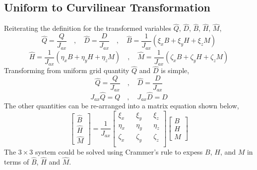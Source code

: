 \documentclass[a4paper, 12pt]{report}
\begin{document}
\begin{center}
\subsection{Uniform to Curvilinear Transformation}
\begin{comment}
Crammer's rule not complete yet
\end{comment}
Reiterating the definition for the transformed variables $\hat{Q}$, $\hat{D}$, $\hat{B}$, $\hat{H}$, $\hat{M}$,
$$\hat{Q} = \frac{Q}{J_{ax}} \quad,\quad \hat{D} = \frac{D}{J_{ax}} \quad,\quad \hat{B} = \frac{1}{J_{ax}}\left(\xi_{x}B + \xi_{y}H + \xi_{z}M\right) $$
$$\hat{H} = \frac{1}{J_{ax}}\left(\eta_{x}B + \eta_{y}H + \eta_{z}M\right) \quad,\quad \hat{M} = \frac{1}{J_{ax}}\left(\zeta_{x}B + \zeta_{y}H + \zeta_{z}M\right)$$
Transforming from uniform grid quantity $\hat{Q}$ and $\hat{D}$ is simple,
$$\hat{Q} = \frac{Q}{J_{ax}} \quad,\quad \hat{D} = \frac{D}{J_{ax}} $$
\begin{equation}
J_{ax}\hat{Q} = Q \quad,\quad J_{ax}\hat{D} = D
\label{QDhat -> QD normal}
\end{equation}
The other quantities can be re-arranged into a matrix equation shown below,
$$\begin{bmatrix}
\hat{B} \\ \hat{H} \\ \hat{M}
\end{bmatrix} = \frac{1}{J_{ax}}\begin{bmatrix}
\xi_{x} && \xi_{y} && \xi_{z} \\
\eta_{x} && \eta_{y} && \eta_{z} \\
\zeta_{x} && \zeta_{y} && \zeta_{z} \\
\end{bmatrix}\begin{bmatrix}
B \\ H \\ M
\end{bmatrix}$$
The $3\times3$ system could be solved using Crammer's rule to expess $B$, $H$, and $M$ in terms of $\hat{B}$, $\hat{H}$ and $\hat{M}$.



\end{center}
\end{document}
